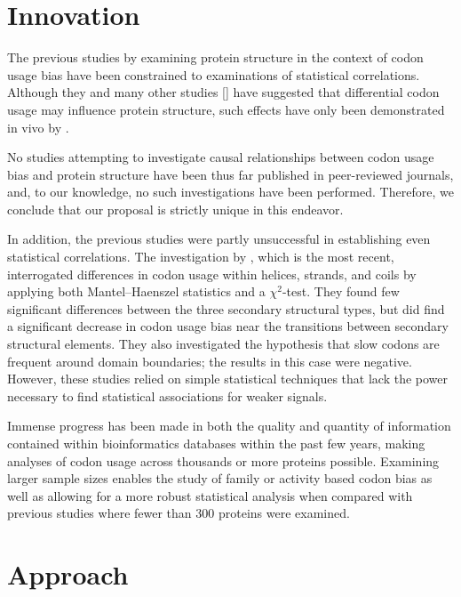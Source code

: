 \documentclass[11pt]{nih}
\begin{document}
\section{Innovation}

The previous studies by \citet{Saunders2010,Biro2006,Adzhubei1996,Gu2003} examining protein structure in the context of codon usage bias have been constrained to examinations of statistical correlations. Although they and many other studies [] have suggested that differential codon usage may influence protein structure, such effects have only been demonstrated in vivo by \citet{Zhou2013,Kimchi-Sarfaty2007}.

No studies attempting to investigate causal relationships between codon usage bias and protein structure have been thus far published in peer-reviewed journals, and, to our knowledge, no such investigations have been performed. Therefore, we conclude that our proposal is strictly unique in this endeavor.

In addition, the previous studies were partly unsuccessful in establishing even statistical correlations. The investigation by \citet{Saunders2010}, which is the most recent, interrogated differences in codon usage  within helices, strands, and coils by applying both Mantel--Haenszel statistics and a $\chi^2$-test. They found few significant differences between the three secondary structural types, but did find a significant decrease in codon usage bias near the transitions between secondary structural elements. They also investigated the hypothesis that slow codons are frequent around domain boundaries; the results in this case were negative. However, these studies relied on simple statistical techniques that lack the power necessary to find statistical associations for weaker signals.

Immense progress has been made in both the quality and quantity of information contained within bioinformatics databases within the past few years, making analyses of codon usage across thousands or more proteins possible. Examining larger sample sizes enables the study of family or activity based codon bias as well as allowing for a more robust statistical analysis when compared with previous studies where fewer than 300 proteins were examined.

\section{Approach}
\end{document}
